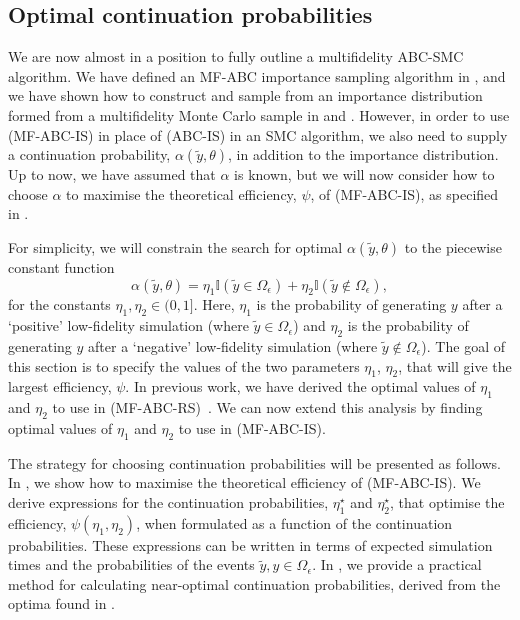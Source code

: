 \documentclass[12pt, onecolumn]{article}
\begin{document}
\subsection{Optimal continuation probabilities}
\label{s:eta}

We are now almost in a position to fully outline a multifidelity ABC-SMC algorithm.
We have defined an MF-ABC importance sampling algorithm in , and we have shown how to construct and sample from an importance distribution formed from a multifidelity Monte Carlo sample in  and .
However, in order to use  (MF-ABC-IS) in place of  (ABC-IS) in an SMC algorithm, we also need to supply a continuation probability, $\alpha(\tilde y, \theta)$, in addition to the importance distribution.
Up to now, we have assumed that $\alpha$ is known, but we will now consider how to choose $\alpha$ to maximise the theoretical efficiency, $\psi$, of  (MF-ABC-IS), as specified in .

For simplicity, we will constrain the search for optimal $\alpha(\tilde y, \theta)$ to the piecewise constant function
\begin{equation}
\label{eq:constantrates}
 \alpha(\tilde y, \theta) = \eta_1 \mathbb I(\tilde y \in \Omega_{\epsilon}) + \eta_2 \mathbb I(\tilde y \notin \Omega_{\epsilon}),
\end{equation}
for the constants $\eta_1, \eta_2 \in (0,1]$.
Here, $\eta_1$ is the probability of generating $y$ after a `positive' low-fidelity simulation (where $\tilde y \in \Omega_\epsilon$) and $\eta_2$ is the probability of generating $y$ after a `negative' low-fidelity simulation (where $\tilde y \notin \Omega_\epsilon$).
The goal of this section is to specify the values of the two parameters $\eta_1$, $\eta_2$, that will give the largest efficiency, $\psi$.
In previous work, we have derived the optimal values of $\eta_1$ and $\eta_2$ to use in  (MF-ABC-RS)~\cite{Prescott2020}.
We can now extend this analysis by finding optimal values of $\eta_1$ and $\eta_2$ to use in  (MF-ABC-IS).

The strategy for choosing continuation probabilities will be presented as follows.
In , we show how to maximise the theoretical efficiency of  (MF-ABC-IS).
We derive expressions for the continuation probabilities, $\eta_1^\star$ and $\eta_2^\star$, that optimise the efficiency, $\psi(\eta_1,\eta_2)$, when formulated as a function of the continuation probabilities.
These expressions can be written in terms of expected simulation times and the probabilities of the events $\tilde y, y \in \Omega_\epsilon$.
In , we provide a practical method for calculating near-optimal continuation probabilities, derived from the optima found in .
\end{document}
